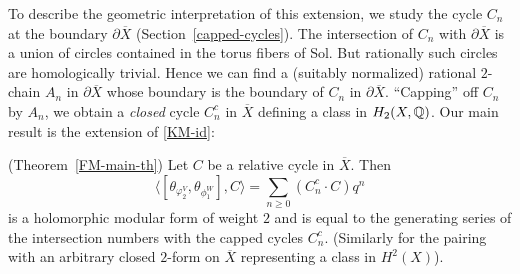 To describe the geometric interpretation of this extension, we study the cycle $C_n$ at the boundary $\partial \overline{X}$ (Section~\ref{capped-cycles}). The intersection of $C_n$ with $\partial \overline{X}$ is a union of circles contained in the torus fibers of Sol. But rationally such circles are homologically trivial. Hence we can find a (suitably normalized) rational $2$-chain $A_n$ in $\partial \overline{X}$ whose boundary is the boundary of $C_n$ in $\partial \overline{X}$. ``Capping'' off $C_n$ by $A_n$, we obtain a {\it closed} cycle $C_n^c$ in $\overline{X}$ defining a class in $H_2({X},\mathbb{Q})$. Our main result is the extension of \eqref{KM-id}:
\begin{theorem}\label{FMHZ-main} (Theorem~\ref{FM-main-th})
 Let $C$ be a relative cycle in $\overline{X}$. Then
\[
\langle [\theta_{\varphi^V_{2}}, \theta_{\phi_1^W}], C \rangle  = \sum_{n \geq 0} (C_n^c \cdot C)q^n
\]
is a holomorphic modular form of weight $2$ and is equal to the generating series of the  intersection numbers with the capped cycles $C^c_n$. (Similarly for the pairing with an arbitrary closed $2$-form on $\overline{X}$ representing a class in $H^2(X)$).
\end{theorem}